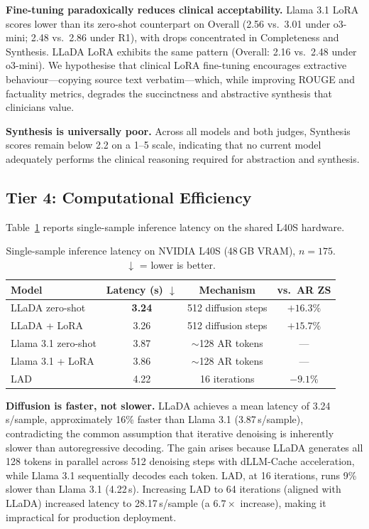 \documentclass[11pt]{article}
\begin{document}
\textbf{Fine-tuning paradoxically reduces clinical acceptability.}
Llama 3.1 LoRA scores lower than its zero-shot counterpart on Overall
(2.56 vs.\ 3.01 under o3-mini; 2.48 vs.\ 2.86 under R1), with drops
concentrated in Completeness and Synthesis. LLaDA LoRA exhibits the same
pattern (Overall: 2.16 vs.\ 2.48 under o3-mini). We hypothesise that
clinical LoRA fine-tuning encourages extractive behaviour---copying source
text verbatim---which, while improving ROUGE and factuality metrics,
degrades the succinctness and abstractive synthesis that clinicians value.

\textbf{Synthesis is universally poor.}
Across all models and both judges, Synthesis scores remain below 2.2 on a
1--5 scale, indicating that no current model adequately performs the
clinical reasoning required for abstraction and synthesis.

\subsection{Tier 4: Computational Efficiency}

Table~\ref{tab:efficiency} reports single-sample inference latency on the
shared L40S hardware.

\begin{table}[htbp]
\small
\centering
\begin{tabular}{lccc}
\hline
\textbf{Model} & \textbf{Latency (s)} $\downarrow$ & \textbf{Mechanism} & \textbf{vs.\ AR ZS} \\
\hline
LLaDA zero-shot     & \textbf{3.24} & 512 diffusion steps & \textbf{$+16.3\%$} \\
LLaDA + LoRA        & 3.26           & 512 diffusion steps & $+15.7\%$ \\
Llama 3.1 zero-shot & 3.87           & $\sim$128 AR tokens  & --- \\
Llama 3.1 + LoRA    & 3.86           & $\sim$128 AR tokens  & --- \\
\hline
LAD                 & 4.22           & 16 iterations        & $-9.1\%$ \\
\hline
\end{tabular}
\caption{Single-sample inference latency on NVIDIA L40S (48\,GB VRAM), $n=175$. $\downarrow$ = lower is better.}
\label{tab:efficiency}
\end{table}

\textbf{Diffusion is faster, not slower.}
LLaDA achieves a mean latency of 3.24\,s/sample, approximately 16\% faster
than Llama 3.1 (3.87\,s/sample), contradicting the common assumption that
iterative denoising is inherently slower than autoregressive decoding. The
gain arises because LLaDA generates all 128 tokens in parallel across 512
denoising steps with dLLM-Cache acceleration, while Llama 3.1 sequentially
decodes each token. LAD, at 16 iterations, runs 9\% slower than Llama 3.1
(4.22\,s). Increasing LAD to 64 iterations (aligned with LLaDA) increased
latency to 28.17\,s/sample (a $6.7\times$ increase), making it impractical
for production deployment.
\end{document}
